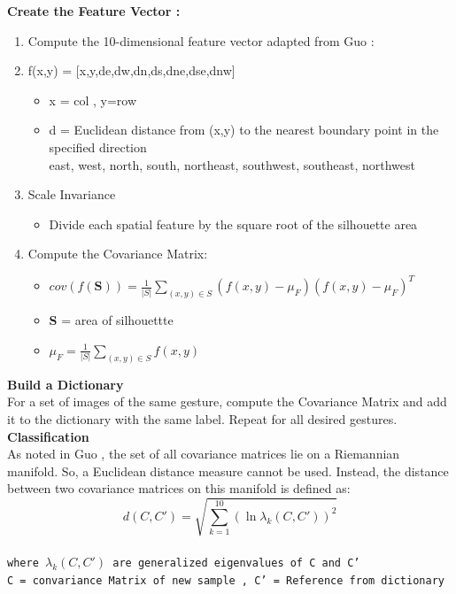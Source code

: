 \textbf{Create the Feature Vector :}\\
\begin{enumerate}
    \item Compute the 10-dimensional feature vector adapted from Guo \cite{21} : 
    
    \item f(x,y) = [x,y,de,dw,dn,ds,dne,dse,dnw]
    \begin{itemize}
        \item x = col , y=row
        \item d =  Euclidean distance from (x,y) to the nearest boundary point in the specified
direction \\
east, west, north, south, northeast, southwest, southeast, northwest
    \end{itemize}
    \item Scale Invariance 
    \begin{itemize}
        \item Divide each spatial feature by the square root of the silhouette area
     
    \end{itemize}
    \item Compute the Covariance Matrix: 
    \begin{itemize}
        \item $cov(f(\textbf{S}))=\frac{1}{|S|}\sum_{(x,y) \in S }(f(x,y)-\mu_{F})(f(x,y)-\mu_{F})^{T}$
        \item \textbf{S} = area of silhouettte 
        \item $\mu_{F} = \frac{1}{|S|}\sum_{(x,y) \in S } f(x,y) $
    \end{itemize}
    
\end{enumerate}
\textbf{Build a Dictionary }\\
For a set of images of the same gesture, compute the Covariance Matrix and add it to
the dictionary with the same label. Repeat for all desired gestures.\\
\textbf{Classification }\\
As noted in Guo \cite{21}, the set of all covariance matrices lie on a Riemannian
manifold. So, a Euclidean distance measure cannot be used. Instead, the distance
between two covariance matrices on this manifold is defined as:\\
$$d(C,C') = \sqrt{\sum_{k=1}^{10} (\ln \lambda_{k}(C,C'))^{2}}$$ \\
\texttt{where $\lambda_{k}(C,C')$ are generalized eigenvalues of C and C'\\
C = convariance Matrix of new sample ,  C' = Reference from dictionary  } \\

